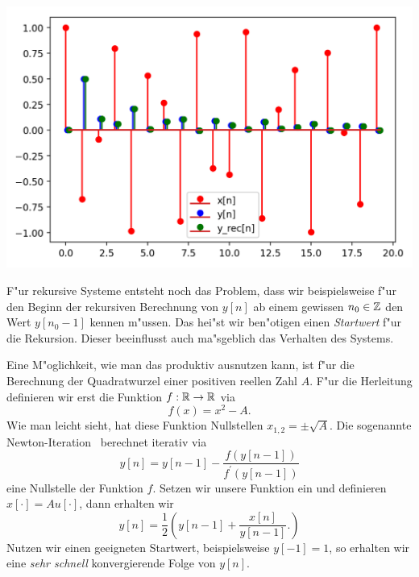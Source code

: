 \begin{listing}
    \noindent
    \begin{minipage}{0.49\textwidth}
        \strut\vspace*{-\baselineskip}\newline
        \inputminted[firstline=5,lastline=20]{python3}{code/cumulative_sum.py}
    \end{minipage}%
    \begin{minipage}{0.49\textwidth}
        \strut\vspace*{-\baselineskip}\newline
        \includegraphics[width=\textwidth]{code/cumulative_sum.png}
    \end{minipage}
    \label{py:cumulative_sum}
\end{listing}
%
%
F"ur rekursive Systeme entsteht noch das Problem, dass wir beispielsweise f"ur den Beginn der rekursiven Berechnung von $y[n]$ ab einem gewissen $n_0 \in \mathbb{Z}$ den Wert $y[n_0-1]$ kennen m"ussen.
Das hei"st wir ben"otigen einen \emph{Startwert} f"ur die Rekursion.
Dieser beeinflusst auch ma"sgeblich das Verhalten des Systems.

Eine M"oglichkeit, wie man das produktiv ausnutzen kann, ist f"ur die Berechnung der Quadratwurzel einer positiven reellen Zahl $A$.
F"ur die Herleitung definieren wir erst die Funktion $f : \mathbb{R} \rightarrow \mathbb{R}$ via
\[
f(x) = x^2 - A.
\]
Wie man leicht sieht, hat diese Funktion Nullstellen $x_{1,2} = \pm \sqrt{A}$.
Die sogenannte Newton-Iteration~ berechnet iterativ via
\[
y[n] = y[n-1] - \frac{f(y[n-1])}{f^\prime(y[n-1])}
\]
eine Nullstelle der Funktion $f$.
Setzen wir unsere Funktion ein und definieren $x[\cdot] = A u[\cdot]$, dann erhalten wir
\[
y[n] = \frac 12 \left(
    y[n-1] + \frac{x[n]}{y[n-1]}.
\right)
\]
Nutzen wir einen geeigneten Startwert, beispielsweise $y[-1] = 1$, so erhalten wir eine \emph{sehr schnell} konvergierende Folge von $y[n]$.

